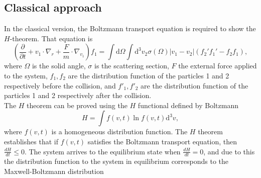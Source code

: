 \documentclass{article}
\begin{document}
\subsection{Classical approach}
In the classical version, the Boltzmann transport equation is required to show the $H$-theorem. That equation is
\begin{equation}
    \left( \frac{\partial }{\partial t}+v_1 \cdot \nabla_r +\frac{F}{m} \cdot \nabla_{v_1} \right)f_1=\int \mathrm{d}\Omega \int \mathrm{d}^{3}v_2\sigma(\Omega)|v_1-v_2|(f_2'f_1'-f_2f_1),
\end{equation}
where $\Omega$ is the solid angle, $\sigma$ is the scattering section, $F$ the external force applied to the system, $f_1, f_2$ are the distribution function of the particles 1 and 2 respectively before the collision, and $f'_1, f'_2$ are the distribution function of the particles 1 and 2 respectively after the collision.\\
The $H$ theorem can be proved using the $H$ functional defined by Boltzmann 
\begin{equation}
    H=\int f(v,t) \ln f(v,t) \mathrm{d}^{3}v,\label{hfunctional}
\end{equation} 
where $f(v,t)$ is a homogeneous distribution function. The $H$ theorem establishes that if $f(v,t)$ satisfies the Boltzmann transport equation, then $\frac{dH}{dt}\leq 0$. The system arrives to the equilibrium state when $\frac{dH}{dt}=0$, and due to this the distribution function to the system in equilibrium corresponds to the Maxwell-Boltzmann distribution
\end{document}
